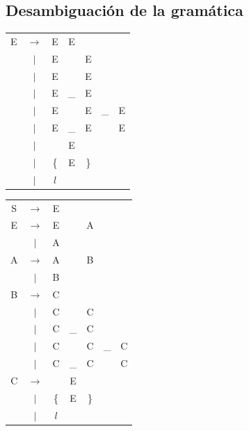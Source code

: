 \documentclass[a4paper, 10pt, twoside]{article}
\begin{document}
\subsection{Desambiguación de la gramática}

\begin{table}[H]
\begin{tabular} {c c c c c c c}

E & $\rightarrow$ & E & E                 &   & & \\
  & $|$           & E & \detokenize{/}    & E & & \\
  & $|$           & E & \detokenize{^}    & E & & \\
  & $|$           & E & \_                & E & & \\
  & $|$           & E & \detokenize{^}    & E & \_  & E \\
  & $|$           & E & \_                & E & \detokenize{^} & E \\
  & $|$           & \detokenize{(}        & E & \detokenize{)} & & \\
  & $|$           & \{                    & E & \} & & \\
  & $|$           & $l$ & & & & \\
\end{tabular}
\quad \quad \quad \quad \quad \quad \quad \quad \quad \quad
\begin{tabular} {c c c c c c c}

S & $\rightarrow$ & E &                   &   & & \\
E & $\rightarrow$ & E & \detokenize{/}    & A & & \\
  & $|$           & A &                   &   & & \\
A & $\rightarrow$ & A &                   & B & & \\
  & $|$           & B &                   &   & & \\
B & $\rightarrow$ & C &                   &   & & \\
  & $|$           & C & \detokenize{^}    & C & & \\
  & $|$           & C & \_                & C & & \\
  & $|$           & C & \detokenize{^}    & C & \_  & C \\
  & $|$           & C & \_                & C & \detokenize{^} & C \\
C & $\rightarrow$ & \detokenize{(}        & E & \detokenize{)} & & \\
  & $|$           & \{                    & E & \} & & \\
  & $|$           & $l$                  & & & & \\

\end{tabular}
\end{table}
\end{document}
